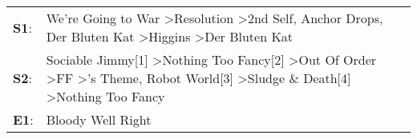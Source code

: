 \begin{supertabular}{p{0.03\textwidth}p{0.92\textwidth}}
 \textbf{S1}:  &                                                                                  We're Going to War\textsuperscript{} \textgreater \enspace Resolution\textsuperscript{} \textgreater \enspace 2nd Self\textsuperscript{}, \enspace Anchor Drops\textsuperscript{}, \enspace Der Bluten Kat\textsuperscript{} \textgreater \enspace Higgins\textsuperscript{} \textgreater \enspace Der Bluten Kat\textsuperscript{}  \enspace  \\
 \textbf{S2}:  &  Sociable Jimmy[1]\textsuperscript{} \textgreater \enspace Nothing Too Fancy[2]\textsuperscript{} \textgreater \enspace Out Of Order\textsuperscript{} \textgreater \enspace FF\textsuperscript{} \textgreater {}'s Theme\textsuperscript{}, \enspace Robot World[3]\textsuperscript{} \textgreater \enspace Sludge \& Death[4]\textsuperscript{} \textgreater \enspace Nothing Too Fancy\textsuperscript{}  \enspace  \\
 \textbf{E1}:  &                                                                                                                                                                                                                                                                                                                                                                                  Bloody Well Right\textsuperscript{}  \enspace  \\
\end{supertabular}
